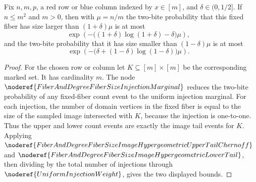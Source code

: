 \begin{helper}
Fix \(n,m,p\), a red row or blue column indexed by \(x\in [m]\), and
\(\delta\in(0,1/2]\).  If \(n\le m^2\) and \(m>0\), then with
\(\mu=n/m\) the two-bite probability that this fixed fiber has size larger
than \((1+\delta)\mu\) is at most
\[
  \exp\!\left(-\bigl((1+\delta)\log(1+\delta)-\delta\bigr)\mu\right),
\]
and the two-bite probability that it has size smaller than
\((1-\delta)\mu\) is at most
\[
  \exp\!\left(-\bigl(\delta+(1-\delta)\log(1-\delta)\bigr)\mu\right).
\]
\end{helper}
\begin{proof}
For the chosen row or column let \(K\subseteq [m]\times[m]\) be the
corresponding marked set.  It has cardinality \(m\).  The node
\(\noderef{FiberAndDegreeFiberSizeInjectionMarginal}\) reduces the two-bite
probability of any fixed-fiber count event to the uniform injection marginal.
For each injection, the number of domain vertices in the fixed fiber is equal
to the size of the sampled image intersected with \(K\), because the injection
is one-to-one.  Thus the upper and lower count events are exactly the image
tail events for \(K\).  Applying
\(\noderef{FiberAndDegreeFiberSizeImageHypergeometricUpperTailChernoff}\) and
\(\noderef{FiberAndDegreeFiberSizeImageHypergeometricLowerTail}\), then
dividing by the total number of injections through
\(\noderef{UniformInjectionWeight}\), gives the two displayed bounds.
\end{proof}
